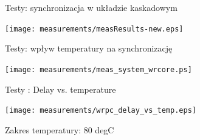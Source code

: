 \documentclass[compress,red]{beamer}
\begin{document}
\begin{frame}{Testy: synchronizacja w układzie kaskadowym}

    \begin{center}
    \texttt{[image: measurements/measResults-new.eps]}
    \end{center}


\end{frame}
\begin{frame}{Testy: wpływ temperatury na synchronizację}

    \begin{center}
    \texttt{[image: measurements/meas\_system\_wrcore.ps]}
    \end{center}

\end{frame}
\begin{frame}{Testy : Delay vs. temperature}

  \begin{center}
  \texttt{[image: measurements/wrpc\_delay\_vs\_temp.eps]}

  Zakres temperatury: 80 degC
  \end{center}

\end{frame}
\end{document}
